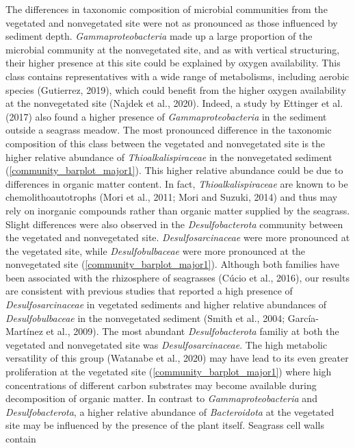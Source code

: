 \documentclass[12pt,]{article}
\begin{document}
The differences in taxonomic composition of microbial communities from
the vegetated and nonvegetated site were not as pronounced as those
influenced by sediment depth. \emph{Gammaproteobacteria} made up a large
proportion of the microbial community at the nonvegetated site, and as
with vertical structuring, their higher presence at this site could be
explained by oxygen availability. This class contains representatives
with a wide range of metabolisms, including aerobic species (Gutierrez,
2019), which could benefit from the higher oxygen availability at the
nonvegetated site (Najdek et al., 2020). Indeed, a study by Ettinger et
al. (2017) also found a higher presence of \emph{Gammaproteobacteria} in
the sediment outside a seagrass meadow. The most pronounced difference
in the taxonomic composition of this class between the vegetated and
nonvegetated site is the higher relative abundance of
\emph{Thioalkalispiraceae} in the nonvegetated sediment
(\autoref {community_barplot_major1}). This higher relative abundance
could be due to differences in organic matter content. In fact,
\emph{Thioalkalispiraceae} are known to be chemolithoautotrophs (Mori et
al., 2011; Mori and Suzuki, 2014) and thus may rely on inorganic
compounds rather than organic matter supplied by the seagrass. Slight
differences were also observed in the \emph{Desulfobacterota} community
between the vegetated and nonvegetated site. \emph{Desulfosarcinaceae}
were more pronounced at the vegetated site, while
\emph{Desulfobulbaceae} were more pronounced at the nonvegetated site
(\autoref {community_barplot_major1}). Although both families have been
associated with the rhizosphere of seagrasses (Cúcio et al., 2016), our
results are consistent with previous studies that reported a high
presence of \emph{Desulfosarcinaceae} in vegetated sediments and higher
relative abundances of \emph{Desulfobulbaceae} in the nonvegetated
sediment (Smith et al., 2004; García-Martínez et al., 2009). The most
abundant \emph{Desulfobacterota} familiy at both the vegetated and
nonvegetated site was \emph{Desulfosarcinaceae}. The high metabolic
versatility of this group (Watanabe et al., 2020) may have lead to its
even greater proliferation at the vegetated site
(\autoref {community_barplot_major1}) where high concentrations of
different carbon substrates may become available during decomposition of
organic matter. In contrast to \emph{Gammaproteobacteria} and
\emph{Desulfobacterota}, a higher relative abundance of
\emph{Bacteroidota} at the vegetated site may be influenced by the
presence of the plant itself. Seagrass cell walls contain
\end{document}
